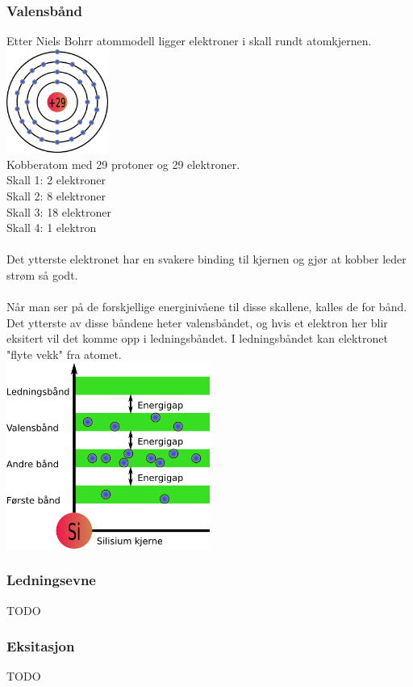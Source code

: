 \subsubsection{Valensbånd}
Etter Niels Bohrr atommodell ligger elektroner i skall rundt atomkjernen.
\\
\includegraphics[width=0.25\textwidth]{./img/bohr-Cu}
\\
Kobberatom med 29 protoner og 29 elektroner.\\
Skall 1: 2 elektroner \\
Skall 2: 8 elektroner \\
Skall 3: 18 elektroner \\
Skall 4: 1 elektron
\\\\
Det ytterste elektronet har en svakere binding til kjernen og gjør at kobber leder strøm så godt.
\\\\
Når man ser på de forskjellige energinivåene til disse skallene,
kalles de for bånd.
Det ytterste av disse båndene heter valensbåndet,
og hvis et elektron her blir eksitert vil det komme opp i ledningsbåndet.
I ledningsbåndet kan elektronet "flyte vekk" fra atomet.
\\
\includegraphics[width=0.5\textwidth]{./img/valence-Cu}



\subsubsection{Ledningsevne}
TODO



\subsubsection{Eksitasjon}
TODO

